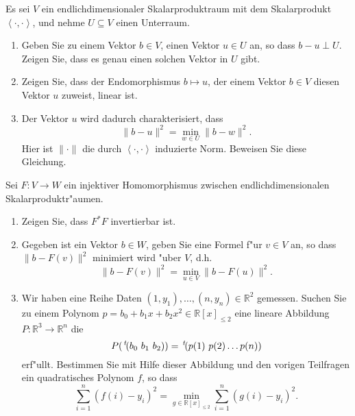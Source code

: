 \documentclass[a4,11pt]{article}
\begin{document}
\vspace*{-17mm}
{
\kopf
}



\begin{aufgabe}[4 Punkte]
Es sei $V$ ein endlichdimensionaler Skalarproduktraum mit dem Skalarprodukt $\left<\cdot , \cdot \right>$, und nehme $U \subseteq V$ einen Unterraum.
  
  \begin{enumerate}
  \item Geben Sie zu einem Vektor $b \in V$, einen Vektor $u \in U$
    an, so dass  $b-u \perp U$. Zeigen Sie, dass es genau einen
    solchen Vektor in $U$ gibt.
  \item Zeigen Sie, dass der Endomorphismus $b \mapsto u$, der einem
    Vektor $b \in V$ diesen Vektor $u$ zuweist, linear ist.
  \item Der Vektor $u$ wird dadurch charakterisiert, dass 
  \[
  \| b - u \|^2 = \min_{w\in U} \| b - w \|^2.
  \]
  Hier ist $\| \cdot \|$ die durch $\left<\cdot , \cdot \right>$
  induzierte Norm. Beweisen Sie diese Gleichung.
\end{enumerate}
\end{aufgabe}

\begin{aufgabe}[4 Punkte]
  Sei $F \colon V \to W$ ein injektiver Homomorphismus zwischen
  endlichdimensionalen Skalarproduktr"aumen.
  \begin{enumerate}
  \item Zeigen Sie, dass $F^*F$ invertierbar ist.
  \item Gegeben ist ein Vektor $b \in W$, geben Sie eine Formel f"ur
    $v \in V$ an, so dass $\| b - F(v) \|^2$ minimiert wird "uber $V$,
    d.h. 
  \[
  \| b - F(v) \|^2 = \min_{u\in V} \| b - F(u) \|^2.
  \]
  \item Wir haben eine Reihe Daten $(1,y_1), \ldots, (n,y_n) \in
    \mathbb{R}^2$ gemessen. Suchen Sie zu einem Polynom $p = b_0 + b_1
    x + b_2 x^2\in \mathbb{R} [x]_{\leq 2}$ eine lineare Abbildung $P
    : \mathbb{R}^3 \rightarrow \mathbb{R}^n$ die
  \[
  P(\,^t\!(b_0 \ b_1 \ b_2)) = \,^t\!(p(1) \ p(2) \dots p(n))
  \]
  erf"ullt.
   Bestimmen Sie mit Hilfe dieser Abbildung und den vorigen Teilfragen
   ein quadratisches Polynom $f$, so dass
  \[
  \sum_{i = 1}^n (f(i)-y_i)^2 = \min_{g \in \mathbb{R} [x]_{\leq 2}} \sum_{i = 1}^n (g(i)-y_i)^2 .
  \]
  \end{enumerate}
\end{aufgabe}
\end{document}
